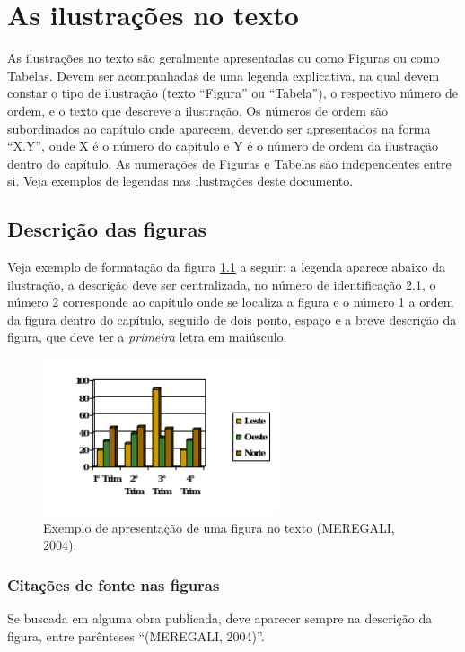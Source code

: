 \chapter{As ilustrações no texto}

As ilustrações no texto são geralmente apresentadas ou como Figuras ou como Tabelas. Devem ser acompanhadas de uma legenda explicativa, na qual devem constar o tipo de ilustração (texto ``Figura'' ou ``Tabela''), o respectivo número de ordem, e o texto que descreve a ilustração. Os números de ordem são subordinados ao capítulo onde aparecem, devendo ser apresentados na forma ``X.Y'', onde X é o número do capítulo e Y é o número de ordem da ilustração dentro do capítulo. As numerações de Figuras e Tabelas são independentes entre si. Veja exemplos de legendas nas ilustrações deste documento.

\section{Descrição das figuras}

Veja exemplo de formatação da figura \ref{fig:grafico} a seguir: a legenda aparece abaixo da ilustração, a descrição deve ser centralizada, no número de identificação 2.1, o número 2 corresponde ao capítulo onde se localiza a figura e o número 1 a ordem da figura dentro do capítulo, seguido de dois ponto, espaço e a breve descrição da figura, que deve ter a \emph{primeira} letra em maiúsculo.

\begin{figure}[h]
    \centerline{\includegraphics{imagens/img-grafico.png}}
    \caption{Exemplo de apresentação de uma figura no texto (MEREGALI, 2004).}
    \label{fig:grafico}
\end{figure}

\subsection{Citações de fonte nas figuras}

Se  buscada em alguma obra publicada, deve aparecer sempre na descrição da figura, entre parênteses ``(MEREGALI, 2004)''.

